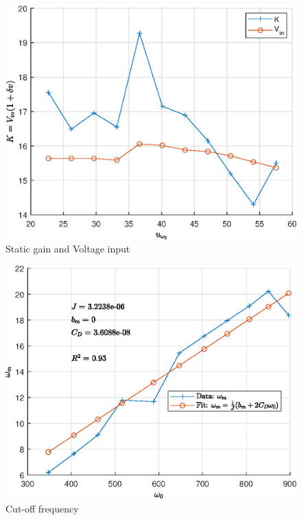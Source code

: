 \begin{minipage}{0.49\textwidth}
 \begin{figure}[H]
    \centering
    \includegraphics[width = \textwidth]{Part2/figs/3_figs/small_perturbation/K-Vin.eps}
    \caption{Static gain and Voltage input}
\end{figure}
\end{minipage}
\begin{minipage}{0.49\textwidth}
\begin{figure}[H]
    \centering
    \includegraphics[width = \textwidth]{Part2/figs/3_figs/small_perturbation/omega_fit.eps}
    \caption{Cut-off frequency}
\end{figure}
\end{minipage}


